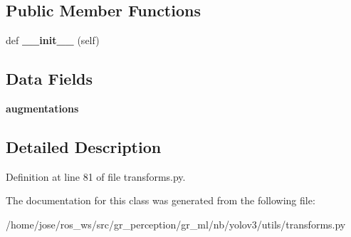 \subsection*{Public Member Functions}
\begin{DoxyCompactItemize}
\item 
\mbox{\label{classutils_1_1transforms_1_1PadSquare_aa144d48d167d5aeeb53c20bdc04b27ed}} 
def {\bfseries \+\_\+\+\_\+init\+\_\+\+\_\+} (self)
\end{DoxyCompactItemize}
\subsection*{Data Fields}
\begin{DoxyCompactItemize}
\item 
\mbox{\label{classutils_1_1transforms_1_1PadSquare_ab9881a217f61b906b107e7ae5efd8e6b}} 
{\bfseries augmentations}
\end{DoxyCompactItemize}


\subsection{Detailed Description}


Definition at line 81 of file transforms.\+py.



The documentation for this class was generated from the following file\+:\begin{DoxyCompactItemize}
\item 
/home/jose/ros\+\_\+ws/src/gr\+\_\+perception/gr\+\_\+ml/nb/yolov3/utils/transforms.\+py\end{DoxyCompactItemize}
